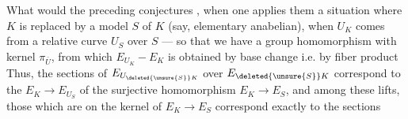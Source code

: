 What would the preceding conjectures , when one applies them  a situation where $K$ is replaced by a model $S$ of $K$ (say, elementary anabelian), when $U_K$ comes from a relative curve $U_S$ over $S$ — so that we have a group homomorphism
with kernel $\pi_{\bar U}$, from which $E_{U_K}-E_K$ is obtained by base change i.e. by fiber product
Thus, the sections of $E_{U_{\deleted{\unsure{S}}K}}$ over $E_{\deleted{\unsure{S}}K}$ correspond to the   $E_K\longrightarrow E_{U_S}$ of the surjective homomorphism $E_K\longrightarrow E_S$, and among these lifts, those which are   on the kernel of $E_K\longrightarrow E_S$ correspond exactly to the sections
